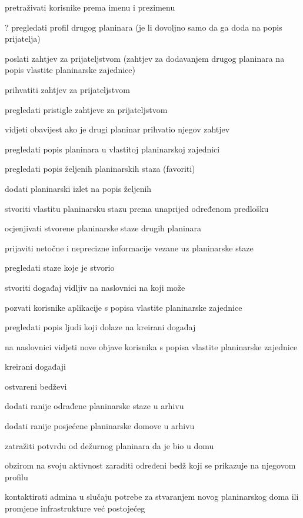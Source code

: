 \begin{packed_enum}
\begin{packed_enum}
\begin{packed_enum}
						\end{packed_enum}
					\item pretraživati korisnike prema imenu i prezimenu
					\item ? pregledati profil drugog planinara (je li dovoljno samo da ga doda na popis prijatelja)
					\item poslati zahtjev za prijateljstvom (zahtjev za dodavanjem drugog planinara na popis vlastite planinarske zajednice)
					\item prihvatiti zahtjev za prijateljstvom
					\item pregledati pristigle zahtjeve za prijateljstvom
					\item vidjeti obavijest ako je drugi planinar prihvatio njegov zahtjev
					\item pregledati popis planinara u vlastitoj planinarskoj zajednici
					\item pregledati popis željenih planinarskih staza (favoriti)
					\item dodati planinarski izlet na popis željenih
					\item stvoriti vlastitu planinarsku stazu prema unaprijed određenom predlošku
					\item ocjenjivati stvorene planinarske staze drugih planinara
					\item prijaviti netočne i neprecizne informacije vezane uz planinarske staze
					\item pregledati staze koje je stvorio
					\item stvoriti događaj vidljiv na naslovnici na koji može
						\begin{packed_enum}
							
							\item  pozvati korisnike aplikacije s popisa vlastite planinarske zajednice 
							\item  pregledati popis ljudi koji dolaze na kreirani događaj
							
						\end{packed_enum}
					\item na naslovnici vidjeti nove objave korisnika s popisa vlastite planinarske zajednice
						\begin{packed_enum}
					
							\item  kreirani događaji
							\item  ostvareni bedževi
							
						\end{packed_enum}
					\item dodati ranije odrađene planinarske staze u arhivu
					\item dodati ranije posjećene planinarske domove u arhivu
					\item zatražiti potvrdu od dežurnog planinara da je bio u domu
					\item obzirom na svoju aktivnost zaraditi određeni bedž koji se prikazuje na njegovom profilu
					\item kontaktirati admina u slučaju potrebe za stvaranjem novog planinarskog doma ili promjene infrastrukture već postojećeg
				\end{packed_enum}
			

\end{packed_enum}
